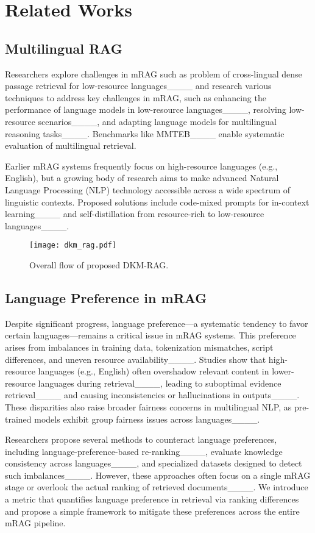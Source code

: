 \section{Related Works}
\subsection{Multilingual RAG}
Researchers explore challenges in mRAG such as problem of cross-lingual dense passage retrieval for low-resource languages____ and research various techniques to address key challenges in mRAG, such as enhancing the performance of language models in low-resource languages____, resolving low-resource scenarios____, and adapting language models for multilingual reasoning tasks____. Benchmarks like \textsc{MMTEB}____ enable systematic evaluation of multilingual retrieval.

Earlier mRAG systems frequently focus on high-resource languages (e.g., English), but a growing body of research aims to make advanced Natural Language Processing (NLP) technology accessible across a wide spectrum of linguistic contexts. Proposed solutions include code-mixed prompts for in-context learning____ and self-distillation from resource-rich to low-resource languages____.


\begin{figure}[h]
    \centering
    \texttt{[image: dkm\_rag.pdf]}
    \caption{Overall flow of proposed DKM-RAG.}
    \label{fig:dkm_rag}
\end{figure}

\subsection{Language Preference in mRAG}
Despite significant progress, language preference—a systematic tendency to favor certain languages—remains a critical issue in mRAG systems. This preference arises from imbalances in training data, tokenization mismatches, script differences, and uneven resource availability____. Studies show that high-resource languages (e.g., English) often overshadow relevant content in lower-resource languages during retrieval____, leading to suboptimal evidence retrieval____ and causing inconsistencies or hallucinations in outputs____. These disparities also raise broader fairness concerns in multilingual NLP, as pre-trained models exhibit group fairness issues across languages____.


Researchers propose several methods to counteract language preferences, including language-preference-based re-ranking____, evaluate knowledge consistency across languages____, and specialized datasets designed to detect such imbalances____. However, these approaches often focus on a single mRAG stage or overlook the actual ranking of retrieved documents____. We introduce a metric that quantifies language preference in retrieval via ranking differences and propose a simple framework to mitigate these preferences across the entire mRAG pipeline.
